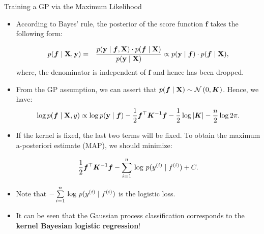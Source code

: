 \begin{frame}[c,allowframebreaks]{Training a GP via the Maximum Likelihood}
\begin{itemize}
\item According to Bayes' rule, the posterior of the score function $\bm{f}$ takes the following form:

\vspace{-0.5cm}
\begin{eqnarray*}p(\bm{f}\mid\mathbf{X}, \mathbf{y}) &=&  \frac{p(\mathbf{y}\mid\bm{f}, \mathbf{X}) \cdot p(\bm{f}\mid\mathbf{X})}{p(\mathbf{y}\mid\mathbf{X})} \propto p(\mathbf{y}\mid\bm{f}) \cdot p(\bm{f}\mid\mathbf{X}),\end{eqnarray*}
\vspace{-2mm}
where, the denominator is independent of $\bm{f}$ and hence has been dropped.

\vspace{15mm}

\item From the GP assumption, we can assert that $p(\bm{f}\mid\mathbf{X}) \sim \mathcal{N}\left(0, \bm{K}\right)$. Hence, we have:
\vspace{-2mm}
$$\log p(\bm{f}\mid\mathbf{X}, y) \propto \log p(\mathbf{y}\mid\bm{f}) - \frac{1}{2} \bm{f}^\top \bm{K}^{-1} \bm{f} - \frac{1}{2} \log |\bm{K}| - \frac{n}{2} \log 2 \pi.$$

\end{itemize}


\framebreak

\begin{itemize}

\item If the kernel is fixed, the last two terms will be fixed. To obtain the maximum a-posteriori estimate (MAP), we should minimize:

$$\frac{1}{2} \bm{f}^\top \bm{K}^{-1}\bm{f} - \sum\limits_{i=1}^n\, \log\, p(y^{(i)}\mid f^{(i)}) + C.$$

\vspace{0.5cm}
\item Note that $-\sum\limits_{i=1}^n\,\log \,p(y^{(i)}\mid f^{(i)})$ is the logistic loss.

\vspace{0.7cm}
\item It can be seen that the Gaussian process classification corresponds to the \textbf{kernel Bayesian logistic regression}!
\end{itemize}

\end{frame}




